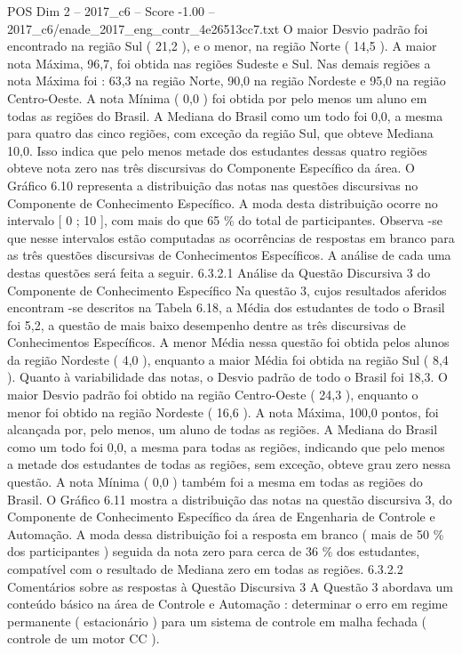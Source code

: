 \begin{textsample}{POS Dim 2 – 2017\_c6 – Score -1.00 – 2017\_c6/enade\_2017\_eng\_contr\_4e26513cc7.txt}
O maior Desvio padrão foi encontrado na região Sul ( 21,2 ), e o menor, na região Norte ( 14,5 ).
A maior nota Máxima, 96,7, foi obtida nas regiões Sudeste e Sul.
Nas demais regiões a nota Máxima foi : 63,3 na região Norte, 90,0 na região Nordeste e 95,0 na região Centro-Oeste.
A nota Mínima ( 0,0 ) foi obtida por pelo menos um aluno em todas as regiões do Brasil.
A Mediana do Brasil como um todo foi 0,0, a mesma para quatro das cinco regiões, com exceção da região Sul, que obteve Mediana 10,0.
Isso indica que pelo menos metade dos estudantes dessas quatro regiões obteve nota zero nas três discursivas do Componente Específico da área.
O Gráfico 6.10 representa a distribuição das notas nas questões discursivas no Componente de Conhecimento Específico.
A moda desta distribuição ocorre no intervalo [ 0 ; 10 ], com mais do que 65 \% do total de participantes.
Observa -se que nesse intervalos estão computadas as ocorrências de respostas em branco para as três questões discursivas de Conhecimentos Específicos.
A análise de cada uma destas questões será feita a seguir. 6.3.2.1 Análise da Questão Discursiva 3 do Componente de Conhecimento Específico Na questão 3, cujos resultados aferidos encontram -se descritos na Tabela 6.18, a Média dos estudantes de todo o Brasil foi 5,2, a questão de mais baixo desempenho dentre as três discursivas de Conhecimentos Específicos.
A menor Média nessa questão foi obtida pelos alunos da região Nordeste ( 4,0 ), enquanto a maior Média foi obtida na região Sul ( 8,4 ).
Quanto à variabilidade das notas, o Desvio padrão de todo o Brasil foi 18,3.
O maior Desvio padrão foi obtido na região Centro-Oeste ( 24,3 ), enquanto o menor foi obtido na região Nordeste ( 16,6 ).
A nota Máxima, 100,0 pontos, foi alcançada por, pelo menos, um aluno de todas as regiões.
A Mediana do Brasil como um todo foi 0,0, a mesma para todas as regiões, indicando que pelo menos a metade dos estudantes de todas as regiões, sem exceção, obteve grau zero nessa questão.
A nota Mínima ( 0,0 ) também foi a mesma em todas as regiões do Brasil.
O Gráfico 6.11 mostra a distribuição das notas na questão discursiva 3, do Componente de Conhecimento Específico da área de Engenharia de Controle e Automação.
A moda dessa distribuição foi a resposta em branco ( mais de 50 \% dos participantes ) seguida da nota zero para cerca de 36 \% dos estudantes, compatível com o resultado de Mediana zero em todas as regiões. 6.3.2.2 Comentários sobre as respostas à Questão Discursiva 3 A Questão 3 abordava um conteúdo básico na área de Controle e Automação : determinar o erro em regime permanente ( estacionário ) para um sistema de controle em malha fechada ( controle de um motor CC ).

\end{textsample}
